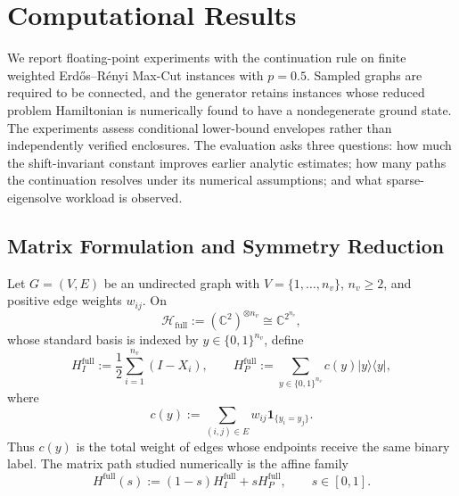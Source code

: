 \documentclass[11pt, a4paper]{article}
\newcommand{\bra}[1]{\langle #1 |}
\newcommand{\ket}[1]{| #1 \rangle}
\begin{document}
\section{Computational Results}

We report floating-point experiments with the continuation rule on finite weighted Erd\H{o}s--R\'{e}nyi Max-Cut instances with $p=0.5$. Sampled graphs are required to be connected, and the generator retains instances whose reduced problem Hamiltonian is numerically found to have a nondegenerate ground state. The experiments assess conditional lower-bound envelopes rather than independently verified enclosures. The evaluation asks three questions: how much the shift-invariant constant improves earlier analytic estimates; how many paths the continuation resolves under its numerical assumptions; and what sparse-eigensolve workload is observed.

\subsection{Matrix Formulation and Symmetry Reduction}
Let $G=(V,E)$ be an undirected graph with $V=\{1,\ldots,n_v\}$, $n_v\ge2$, and positive edge weights $w_{ij}$. On
\begin{equation}
\mathcal H_{\mathrm{full}}:=(\mathbb C^2)^{\otimes n_v}
\cong\mathbb C^{2^{n_v}},
\end{equation}
whose standard basis is indexed by $y\in\{0,1\}^{n_v}$, define
\begin{equation}
\label{eq:full-endpoint-matrices}
H_I^{\mathrm{full}}:=\frac12\sum_{i=1}^{n_v}(I-X_i),
\qquad
H_P^{\mathrm{full}}:=\sum_{y\in\{0,1\}^{n_v}}c(y)\ket{y}\!\bra{y},
\end{equation}
where
\begin{equation}
c(y):=\sum_{(i,j)\in E}w_{ij}\mathbf 1_{\{y_i=y_j\}}.
\end{equation}
Thus $c(y)$ is the total weight of edges whose endpoints receive the same binary label. The matrix path studied numerically is the affine family
\begin{equation}
H^{\mathrm{full}}(s):=(1-s)H_I^{\mathrm{full}}+sH_P^{\mathrm{full}},
\qquad s\in[0,1].
\end{equation}
\end{document}
